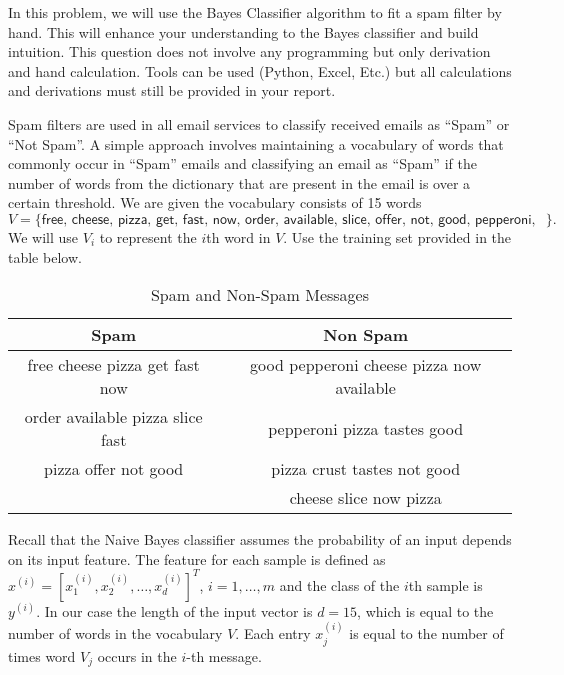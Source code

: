 \documentclass[12pt]{article}
\begin{document}
In this problem, we will use the  Bayes Classifier algorithm to fit a spam filter by hand. This will enhance your understanding to the Bayes classifier and build intuition. This question does not involve any programming but only derivation and hand calculation. Tools can be used (Python, Excel, Etc.) but all calculations and derivations must still be provided in your report.

Spam filters are used in all email services to classify received emails as ``Spam'' or ``Not Spam''. A simple approach involves maintaining a vocabulary of words that commonly occur in ``Spam'' emails and classifying an email as ``Spam'' if the number of words from the dictionary that are present in the email is over a certain threshold.
We are given the vocabulary consists of 15 words \[V=\{\textsf{free, cheese, pizza, get, fast, now, order, available, slice, offer, not, good, pepperoni, tastes, crust}\}.\] We will use $V_i$ to represent the $i$th word in $V$. Use the training set provided in the table below.

\begin{table}[H]
    \centering
    \begin{tabular}{|c|c|}
        \hline
        \textbf{Spam} & \textbf{Non Spam} \\
        \hline
        \textsf{free cheese pizza get fast now} & \textsf{good pepperoni cheese pizza now available} \\
        \hline
        \textsf{order available pizza slice fast} & \textsf{pepperoni pizza tastes good} \\
        \hline
        \textsf{pizza offer not good} & \textsf{pizza crust tastes not good} \\
        \hline
        & \textsf{cheese slice now pizza} \\
        \hline
    \end{tabular}
    \caption{Spam and Non-Spam Messages}
    \label{tab:sentiment_messages}
\end{table}

Recall that the Naive Bayes classifier assumes the probability of an input depends on its input feature. The feature for each sample is defined as
$x^{(i)} = [x_1^{(i)}, x_2^{(i)}, \ldots, x_d^{(i)}]^T$, $i = 1, \ldots, m$ and the class of the $i$th sample is $y^{(i)}$. In our case the length of the input vector is $d = 15$, which is equal to the number of words in the vocabulary $V$. Each entry $x_j^{(i)}$ is equal to the number of times word $V_j$ occurs in the $i$-th message. 
\end{document}
